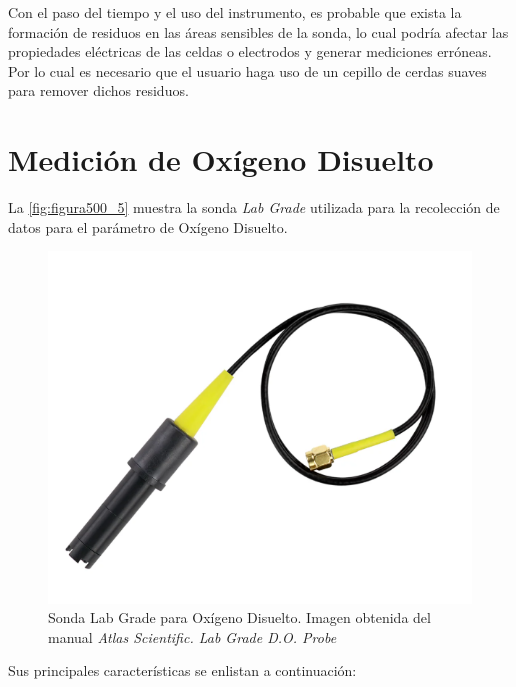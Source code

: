 Con el paso del tiempo y el uso del instrumento, es probable que exista la formación de residuos en las áreas sensibles de la sonda, lo cual podría afectar las propiedades eléctricas de las celdas o electrodos y generar mediciones 
erróneas. Por lo cual es necesario que el usuario haga uso de un cepillo de cerdas suaves para remover dichos residuos.


\clearpage

\section{Medición de Oxígeno Disuelto}

La \autoref{fig:figura500_5} muestra la sonda \textit{Lab Grade} utilizada para la recolección de datos para el parámetro de Oxígeno Disuelto.

\begin{figure}[h]
	\centering
	\includegraphics[scale=0.6]{imgss114.png}
	\caption{Sonda Lab Grade para Oxígeno Disuelto. Imagen obtenida del manual \textit{Atlas Scientific. Lab Grade D.O. Probe}}
	\label{fig:figura500_5}
\end{figure}

Sus principales características se enlistan a continuación:


